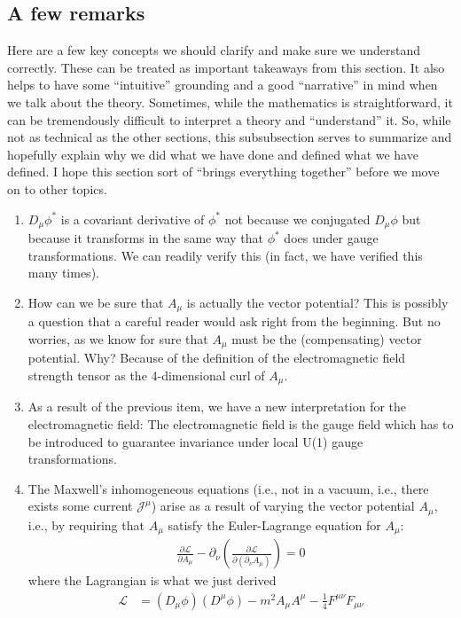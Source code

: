 \documentclass{book}
\numberwithin{equation}{section}
\theoremstyle{definition}
\newcommand{\p}{\partial}
\newcommand{\lag}{\mathcal{L}}
\begin{document}
\subsection{A few remarks}
Here are a few key concepts we should clarify and make sure we understand correctly. These can be treated as important takeaways from this section. It also helps to have some ``intuitive'' grounding and a good ``narrative'' in mind when we talk about the theory. Sometimes, while the mathematics is straightforward, it can be tremendously difficult to interpret a theory and ``understand'' it. So, while not as technical as the other sections, this subsubsection serves to summarize and hopefully explain why we did what we have done and defined what we have defined. I hope this section sort of ``brings everything together'' before we move on to other topics. 
\begin{enumerate}
	\item $D_\mu\phi^*$ is a covariant derivative of $\phi^*$ not because we conjugated $D_\mu\phi$ but because it transforms in the same way that $\phi^*$ does under gauge transformations. We can readily verify this (in fact, we have verified this many times). 
	\item How can we be sure that $A_\mu$ is actually the vector potential? This is possibly a question that a careful reader would ask right from the beginning. But no worries, as we know for sure that $A_\mu$ must be the (compensating) vector potential. Why? Because of the definition of the electromagnetic field strength tensor as the 4-dimensional curl of $A_\mu$. 
	\item As a result of the previous item, we have a new interpretation for the electromagnetic field: The electromagnetic field is the gauge field which has to be introduced to guarantee invariance under local U(1) gauge transformations. 
	\item The Maxwell's inhomogeneous equations (i.e., not in a vacuum, i.e., there exists some current $\mathcal{J}^\mu$) arise as a result of varying the vector potential $A_\mu$, i.e., by requiring that $A_\mu$ satisfy the Euler-Lagrange equation for $A_\mu$:
	\begin{align}
	\frac{\p\lag}{\p A_\mu} - \p_\nu \left( \frac{\p\lag}{\p(\p_\nu A_\mu)} \right) = 0
	\end{align}
	where the Lagrangian is what we just derived
	\begin{align}
	\lag &= (D_\mu\phi)(D^\mu\phi) - m^2 A_\mu A^\mu - \frac{1}{4}F^{\mu\nu}F_{\mu\nu} \\

\end{align}
\end{enumerate}
\end{document}
